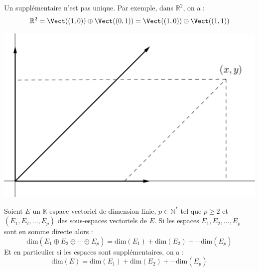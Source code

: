 \documentclass[french,11pt,twoside]{VcCours}
\begin{document}
\medskip

\begin{att} Un supplémentaire n'est pas unique. Par exemple, dans $\mathbb{R}^2$, on a :
$$ \mathbb{R}^2 = \Vect((1,0)) \oplus \Vect((0,1)) = \Vect((1,0)) \oplus \Vect((1,1))$$

\medskip


\begin{center}
\includegraphics[scale=0.3]{Supp}
\end{center}
\end{att}

\begin{Proposition}{} 
Soient $E$ un $\mathbb{K}$-espace vectoriel de dimension finie, $p \in \mathbb{N}^*$ tel que $p \geq 2$ et $(E_1, E_2, \ldots, E_p)$ des sous-espaces vectoriels de $E$. Si les espaces $E_1, E_2, \ldots, E_p$ sont en somme directe alors :
$$ \textrm{dim}(E_1 \oplus E_2 \oplus \cdots \oplus E_p) =\textrm{dim}(E_1) + \textrm{dim}(E_2) + \cdots \textrm{dim}(E_p)$$
Et en particulier si les espaces sont supplémentaires, on a :
$$ \textrm{dim}(E) = \textrm{dim}(E_1) + \textrm{dim}(E_2) + \cdots \textrm{dim}(E_p)$$
\end{Proposition}

\begin{Demonstration}{} 

\vspace{6cm}
\end{Demonstration}
\end{document}
